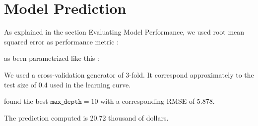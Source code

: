 \documentclass{article}
\begin{document}
\section{Model Prediction}

As explained in the section Evaluating Model Performance, we used root mean squared error as performance metric : 

 as been parametrized like this : 


We used a cross-validation generator of 3-fold. It correspond approximately to the test size of 0.4 used in the learning curve.

 found the best $\texttt{max\_depth} = 10$ with a corresponding RMSE of 5.878.

The prediction computed is 20.72 thousand of dollars.
\end{document}
